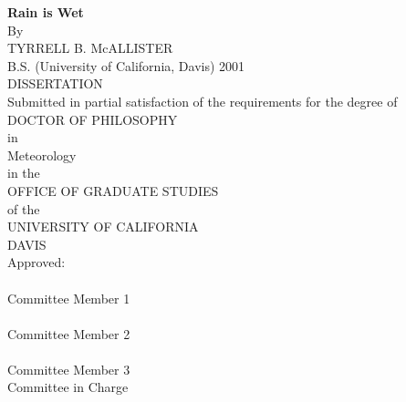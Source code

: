 \begin{center}
   \null\vfill
   \textbf{%
      Rain is Wet
   }%
   \\
   \bigskip
   By \\
   \bigskip
   TYRRELL B. McALLISTER \\
   \bigskip
   B.S. (University of California, Davis) 2001 \\
   \bigskip
   DISSERTATION \\
   \bigskip
   Submitted in partial satisfaction of the requirements for the
   degree of \\
   \bigskip
   DOCTOR OF PHILOSOPHY \\
   \bigskip
   in \\
   \bigskip
   Meteorology \\
   \bigskip
   in the \\
   \bigskip
   OFFICE OF GRADUATE STUDIES \\
   \bigskip        
   of the \\
   \bigskip
   UNIVERSITY OF CALIFORNIA \\
   \bigskip
   DAVIS \\
   \bigskip
   Approved: \\
   \bigskip
   \bigskip
   \makebox[3in]{\hrulefill} \\
   Committee Member 1 \\
   \bigskip
   \bigskip
   \makebox[3in]{\hrulefill} \\
   Committee Member 2 \\
   \bigskip
   \bigskip
   \makebox[3in]{\hrulefill} \\
   Committee Member 3 \\
   \bigskip
   Committee in Charge \\
    \\
   \vfill
\end{center}
